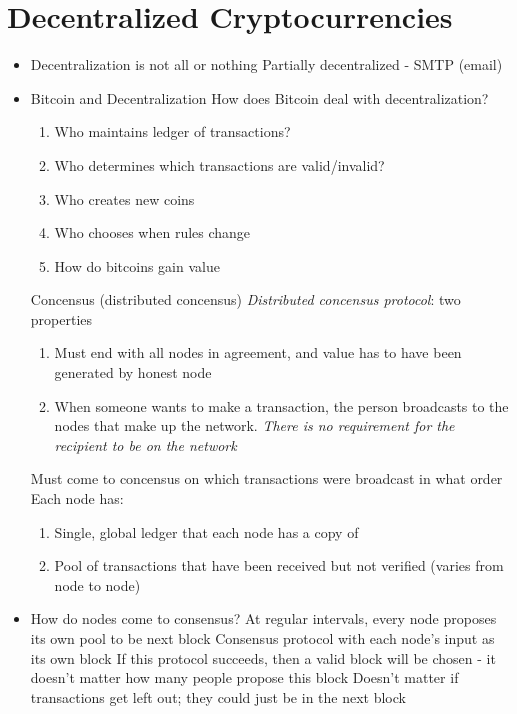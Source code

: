 \documentclass{article}
\begin{document}
\section*{Decentralized Cryptocurrencies}
\begin{itemize}
  \item Decentralization is not all or nothing
    \subitem Partially decentralized - SMTP (email)
  \item Bitcoin and Decentralization
    \subitem How does Bitcoin deal with decentralization?
    \begin{enumerate}
      \item Who maintains ledger of transactions?
      \item Who determines which transactions are valid/invalid?
      \item Who creates new coins
      \item Who chooses when rules change
      \item How do bitcoins gain value
    \end{enumerate}
    \subitem Concensus (distributed concensus)
    \subitem \emph{Distributed concensus protocol}: two properties
    \begin{enumerate}
      \item Must end with all nodes in agreement, and value has to have been generated by honest node
      \item When someone wants to make a transaction, the person broadcasts to the nodes that make up the network. 
      \subitem \emph{There is no requirement for the recipient to be on the network}
    \end{enumerate}
    \subitem Must come to concensus on which transactions were broadcast in what order
    \subitem Each node has:
    \begin{enumerate}
      \item Single, global ledger that each node has a copy of 
      \item Pool of transactions that have been received but not verified (varies from node to node)
    \end{enumerate}
  \item How do nodes come to consensus? 
    \subitem At regular intervals, every node proposes its own pool to be next block
    \subitem Consensus protocol with each node's input as its own block
    \subitem If this protocol succeeds, then a valid block will be chosen - it doesn't matter how many people propose this block
    \subitem Doesn't matter if transactions get left out; they could just be in the next block

\end{itemize}
\end{document}
